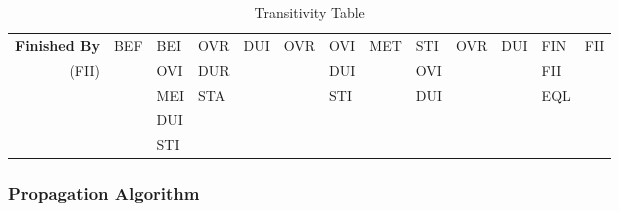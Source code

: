 \documentclass[11pt]{report}
\newenvironment{vvarmargin}[2]
{
  \begin{list}{}
  {
    \setlength{\topsep}{0pt}
    \setlength{\leftmargin}{0pt}
    \setlength{\rightmargin}{0pt}
    \setlength{\listparindent}{\parindent}
    \setlength{\itemindent}{\parindent}
    \setlength{\parsep}{0pt plus 1pt}
    \addtolength{\leftmargin}{#1}\addtolength{\rightmargin}{#2}
  }
  \item
}
{
  \end{list}
}
\begin{document}
\begin{table}[p]
\begin{vvarmargin}{-4cm}{-4cm}
\begin{center}
\begin{tabular}[t]{|r|l|l|l|l|l|l|l|l|l|l|l|l|}
                  \hline
                  \textbf{Finished By}    & BEF                     & BEI                     & OVR                     & DUI                     & OVR                     & OVI                     & MET                     & STI                     & OVR                     & DUI                     & FIN                     & FII                     \\
                  (FII)                   &                         & OVI                     & DUR                     &                         &                         & DUI                     &                         & OVI                     &                         &                         & FII                     &                         \\
                                          &                         & MEI                     & STA                     &                         &                         & STI                     &                         & DUI                     &                         &                         & EQL                     &                         \\
                                          &                         & DUI                     &                         &                         &                         &                         &                         &                         &                         &                         &                         &                         \\
                                          &                         & STI                     &                         &                         &                         &                         &                         &                         &                         &                         &                         &                         \\
                  \hline
                \end{tabular}
              \end{center}
              \caption[]{Transitivity Table}
              \label{table-trans}
            \end{vvarmargin}
          \end{table}

        \subsubsection{Propagation Algorithm}
\end{document}

